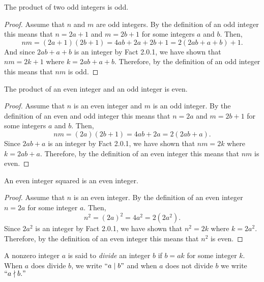 \documentclass{report}
\begin{document}
\begin{proposition*}{}
  The product of two odd integers is odd.
\end{proposition*}

\begin{proof}
  Assume that $n$ and $m$ are odd integers.
  By the definition of an odd integer this means that $n = 2a + 1$ and $m = 2b + 1$ for some integers $a$ and $b$.
  Then, $$nm = (2a + 1)(2b + 1) = 4ab + 2a + 2b + 1 = 2(2ab + a + b) + 1.$$
  And since $2ab + a + b$ is an integer by Fact 2.0.1, we have shown that $nm = 2k + 1$ where $k = 2ab + a + b$.
  Therefore, by the definition of an odd integer this means that $nm$ is odd.
\end{proof}

\begin{proposition*}{}
  The product of an even integer and an odd integer is even.
\end{proposition*}

\begin{proof}
  Assume that $n$ is an even integer and $m$ is an odd integer.
  By the definition of an even and odd integer this means that $n = 2a$ and $m = 2b + 1$ for some integers $a$ and $b$.
  Then, $$nm = (2a)(2b + 1) = 4ab + 2a = 2(2ab + a).$$
  Since $2ab + a$ is an integer by Fact 2.0.1, we have shown that $nm = 2k$ where $k = 2ab + a$.
  Therefore, by the definition of an even integer this means that $nm$ is even.
\end{proof}

\begin{proposition*}{}
  An even integer squared is an even integer.
\end{proposition*}

\begin{proof}
  Assume that $n$ is an even integer.
  By the definition of an even integer $n = 2a$ for some integer $a$.
  Then, $$n^2 = (2a)^2 = 4a^2 = 2(2a^2).$$
  Since $2a^2$ is an integer by Fact 2.0.1, we have shown that $n^2 = 2k$ where $k = 2a^2$.
  Therefore, by the definition of an even integer this means that $n^2$ is even.
\end{proof}

\begin{definition}{}{}
  A nonzero integer $a$ is said to \emph{divide} an integer $b$ if $b = ak$ for some integer $k$.
  When $a$ does divide $b$, we write $``a \mid b"$ and when $a$ does not divide $b$ we write $``a \nmid b."$
\end{definition}
\end{document}
